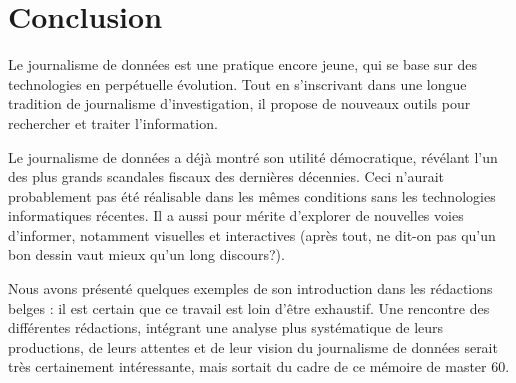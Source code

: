 
\chapter*{Conclusion}

Le journalisme de données est une pratique encore jeune, qui se base sur des technologies en perpétuelle évolution. Tout en s'inscrivant dans une longue tradition de journalisme d'investigation, il propose de nouveaux outils pour rechercher et traiter l'information. 

Le journalisme de données a déjà montré son utilité démocratique, révélant l'un des plus grands scandales fiscaux des dernières décennies. Ceci n'aurait probablement pas été réalisable dans les mêmes conditions sans les technologies informatiques récentes. Il a aussi pour mérite d'explorer de nouvelles voies d'informer, notamment visuelles et interactives (après tout, ne dit-on pas qu'un bon dessin vaut mieux qu'un long discours?).

Nous avons présenté quelques exemples de son introduction dans les rédactions belges : 
il est certain que ce travail est loin d'être exhaustif. Une rencontre des différentes rédactions, intégrant une analyse plus systématique de leurs productions, de leurs attentes et de leur vision du journalisme de données serait très certainement intéressante, mais sortait du cadre de ce mémoire de master 60. 
